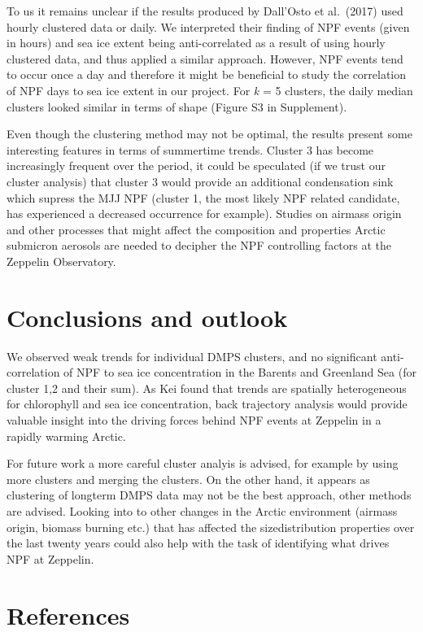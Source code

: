 \documentclass[11pt]{article}
\begin{document}
To us it remains unclear if the results produced by Dall'Osto et
al.~(2017) used hourly clustered data or daily. We interpreted their
finding of NPF events (given in hours) and sea ice extent being
anti-correlated as a result of using hourly clustered data, and thus
applied a similar approach. However, NPF events tend to occur once a day
and therefore it might be beneficial to study the correlation of NPF
days to sea ice extent in our project. For \emph{k} = 5 clusters, the
daily median clusters looked similar in terms of shape (Figure S3 in
Supplement).

Even though the clustering method may not be optimal, the results
present some interesting features in terms of summertime trends. Cluster
3 has become increasingly frequent over the period, it could be
speculated (if we trust our cluster analysis) that cluster 3 would
provide an additional condensation sink which supress the MJJ NPF
(cluster 1, the most likely NPF related candidate, has experienced a
decreased occurrence for example). Studies on airmass origin and other
processes that might affect the composition and properties Arctic
submicron aerosols are needed to decipher the NPF controlling factors at
the Zeppelin Observatory.

    \hypertarget{conclusions-and-outlook}{%
\section{Conclusions and outlook}\label{conclusions-and-outlook}}

We observed weak trends for individual DMPS clusters, and no significant
anti-correlation of NPF to sea ice concentration in the Barents and
Greenland Sea (for cluster 1,2 and their sum). As Kei found that trends
are spatially heterogeneous for chlorophyll and sea ice concentration,
back trajectory analysis would provide valuable insight into the driving
forces behind NPF events at Zeppelin in a rapidly warming Arctic.

For future work a more careful cluster analyis is advised, for example
by using more clusters and merging the clusters. On the other hand, it
appears as clustering of longterm DMPS data may not be the best
approach, other methods are advised. Looking into to other changes in
the Arctic environment (airmass origin, biomass burning etc.) that has
affected the sizedistribution properties over the last twenty years
could also help with the task of identifying what drives NPF at
Zeppelin.

    \hypertarget{references}{%
\section{References}\label{references}}
\end{document}
